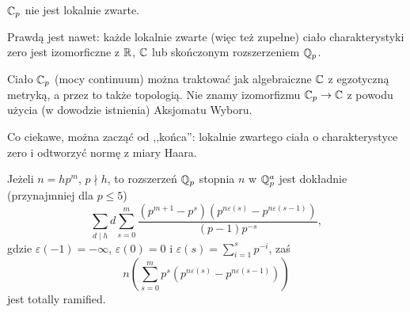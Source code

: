 \begin{fakt} %
	$\mathbb C_p$ nie jest lokalnie zwarte.
\end{fakt}


Prawdą jest nawet: każde lokalnie zwarte (więc też zupełne) ciało charakterystyki zero jest izomorficzne z $\mathbb R$, $\mathbb C$ lub skończonym rozszerzeniem $\mathbb Q_p$.

Ciało $\mathbb C_p$ (mocy continuum) można traktować jak algebraiczne $\mathbb C$ z egzotyczną metryką, a przez to także topologią. Nie znamy izomorfizmu $\mathbb C_p \to \mathbb C$ z powodu użycia (w dowodzie istnienia) Aksjomatu Wyboru.

Co ciekawe, można zacząć od ,,końca'': lokalnie zwartego ciała o charakterystyce zero i odtworzyć normę z miary Haara.

 	
\begin{fakt}
	Jeżeli $n = hp^m$, $p \nmid h$, to rozszerzeń $\mathbb Q_p$ stopnia $n$ w $\mathbb Q_p^a$ jest dokładnie (przynajmniej dla $p \le 5$)
	\[
		\sum_{d \mid h} d \sum_{s=0}^m  \frac{(p^{m+1}-p^{s})(p^{n \varepsilon(s)}-p^{n \varepsilon(s-1)})}{(p-1)p^{-s}},
	\]
	gdzie $\varepsilon (-1) = -\infty$, $\varepsilon(0) = 0$ i $\varepsilon(s) = \sum_{i=1}^s p^{-i}$, zaś
	\[
 		n (\sum_{s=0}^m p^s (p^{n \varepsilon(s)} - p^{n \varepsilon(s-1)})) %
	\]
	jest totally ramified.
\end{fakt}